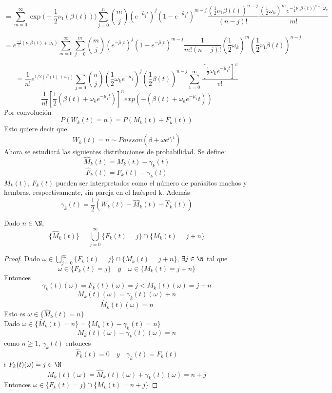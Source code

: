 $$=\sum_{m=0}^\infty\exp\bigg(-\frac{1}{2}\nu_1(\beta(t))\bigg)\sum_{j=0}^n{m \choose j}(e^{-\tilde{\mu_1}t})^j(1-e^{-\tilde{\mu_1}t})^{m-j}\frac{(\frac{1}{2}\nu_1\beta(t))^{n-j}}{(n-j)!}\frac{(\frac{1}{2}\omega_k)^m e^{-\frac{1}{2}\nu_1\beta(t))^{n-j}\omega_k}}{m!}$$ 

$$=e^{\frac{-1}{2}(\nu_1\beta(t)+\omega_k)}\sum_{m=0}^\infty\sum_{j=0}^m{m \choose j}(e^{-\tilde{\mu_1}t})^j(1-e^{-\tilde{\mu_1}t})^{m-j}\frac{1}{m!(n-j)!}(\frac{1}{2}\omega_k)^m(\frac{1}{2}\nu_1\beta(t))^{n-j}$$

$$=\frac{1}{n!}e^{1/2(\beta(t)+\omega_k)} \sum_{j=0}{n\choose j}(\frac{1}{2}\omega_k e^{-\tilde{\mu}_1})^j(\frac{1}{2}\beta(t))^{n-j}\sum_{v=0}^\infty\frac{[\frac{1}{2}\omega_k e^{-\tilde{\mu}_1t}]^v}{v!}  $$
$$\frac{1}{n!}[\frac{1}{2}(\beta(t)+\omega_k e^{-\tilde{\mu}_1t})]^n exp(-(\beta(t)+\omega_k e^{-\tilde{\mu}_1}t) ) $$
Por convolución $$P(W_k(t)=n)=P(M_k(t)+F_k(t))$$
Esto quiere decir que $$W_k(t)=n\sim Poisson(\beta+\omega e^{\tilde{\mu}_1 t})$$
Ahora se estudiará las siguientes distribuciones de probabilidad.
Se define: $$\hat{M}_k(t)=M_k(t)-\gamma_k(t)$$
$$\hat{F}_k(t)=F_k(t)-\gamma_k(t)$$
$M_k(t)$, $F_k(t)$ pueden ser interpretados como el número de parásitos machos y hembras, respectivamente, sin pareja en el huésped k.
Además $$\gamma_k(t)=\frac{1}{2}(W_k(t)-\hat{M}_k(t)-\hat{F}_k(t) )$$
\begin{Lem}
    Dado $n\in\N,$
    $$\{\hat{M}_k(t)\}=\bigcup_{j=0}^\infty \{F_k(t)=j\}\cap\{M_k(t)=j+n\}$$
    \begin{proof}
        Dado $\omega\in\bigcup_{j=0}^\infty \{F_k(t)=j\}\cap\{M_k(t)=j+n\}$, $\exists j\in\N$ tal que $$\omega\in\{F_k(t)=j\}\quad y \quad\omega\in\{M_k(t)=j+n\}$$
        Entonces $$\gamma_k(t)(\omega)=F_k(t)(\omega)=j<M_k(t)(\omega)=j+n$$
        $$M_k(t)(\omega)=\gamma_k(t)(\omega)+n$$
        $$\hat{M}_k(t)(\omega)=n$$
        Esto es $\omega\in\{\hat{M}_k(t)=n\}$\\
        Dado $\omega\in\{\hat{M}_k(t)=n\}=\{M_k(t)-\gamma_k(t)=n\}$\\$$M_k(t)(\omega)-\gamma_k(t)(\omega)=n$$
        como $n\geq 1$, $\gamma_k(t)$ entonces $$\hat{F}_k(t)=0\quad y \quad \gamma_k(t)=F_k(t)$$
        i $F_k(t)(\omega)=j\in\N$
        $$M_k(t)(\omega)=\hat{M}_k(t)(\omega)+\gamma_k(t)(\omega)=n+j$$
        Entonces $\omega\in\{F_k(t)=j\}\cap\{M_k(t)=n+j\}$
    \end{proof}
\end{Lem}
\label{LEMAIMPORTANTE}
